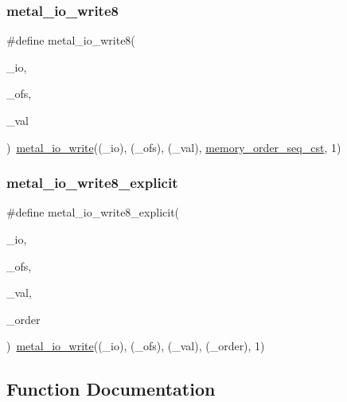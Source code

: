 \subsubsection{\texorpdfstring{metal\+\_\+io\+\_\+write8}{metal\_io\_write8}}
{\footnotesize\ttfamily \#define metal\+\_\+io\+\_\+write8(\begin{DoxyParamCaption}\item[{}]{\+\_\+io,  }\item[{}]{\+\_\+ofs,  }\item[{}]{\+\_\+val }\end{DoxyParamCaption})~\hyperlink{group__io_ga74ef56cd9b16bced8c2b8553956220b4}{metal\+\_\+io\+\_\+write}((\+\_\+io), (\+\_\+ofs), (\+\_\+val), \hyperlink{compiler_2gcc_2atomic_8h_a17c2de5ae768960284c047a320f17d1ba2d21914d1edd227a890107e7878a3752}{memory\+\_\+order\+\_\+seq\+\_\+cst}, 1)}

\mbox{\label{group__io_gaa30723c231c8cbfa52b784a34e449646}} 
\subsubsection{\texorpdfstring{metal\+\_\+io\+\_\+write8\+\_\+explicit}{metal\_io\_write8\_explicit}}
{\footnotesize\ttfamily \#define metal\+\_\+io\+\_\+write8\+\_\+explicit(\begin{DoxyParamCaption}\item[{}]{\+\_\+io,  }\item[{}]{\+\_\+ofs,  }\item[{}]{\+\_\+val,  }\item[{}]{\+\_\+order }\end{DoxyParamCaption})~\hyperlink{group__io_ga74ef56cd9b16bced8c2b8553956220b4}{metal\+\_\+io\+\_\+write}((\+\_\+io), (\+\_\+ofs), (\+\_\+val), (\+\_\+order), 1)}



\subsection{Function Documentation}
\mbox{\label{group__io_ga40c41a84ff9617bf1390328e42c82d8c}} 
